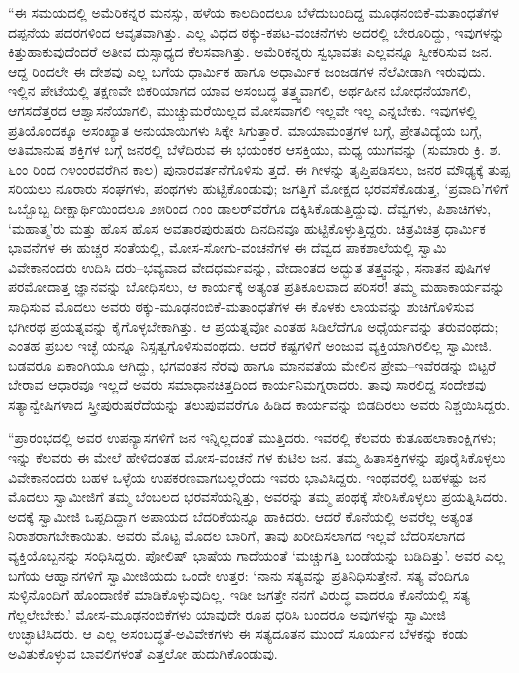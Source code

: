 “ಈ ಸಮಯದಲ್ಲಿ ಅಮೆರಿಕನ್ನರ ಮನಸ್ಸು, ಹಳೆಯ ಕಾಲದಿಂದಲೂ ಬೆಳೆದುಬಂದಿದ್ದ ಮೂಢನಂಬಿಕೆ-ಮತಾಂಧತೆಗಳ ದಪ್ಪನೆಯ ಪದರಗಳಿಂದ ಆವೃತವಾಗಿತ್ತು. ಎಲ್ಲ ವಿಧದ ಠಕ್ಕು-ಕಪಟ-ವಂಚನೆಗಳು ಅದರಲ್ಲಿ ಬೇರೂರಿದ್ದು, ಇವುಗಳನ್ನು ಕಿತ್ತುಹಾಕುವುದೆಂದರೆ ಅತೀವ ದುಸ್ಸಾಧ್ಯದ ಕೆಲಸವಾಗಿತ್ತು. ಅಮೆರಿಕನ್ನರು ಸ್ವಭಾವತಃ ಎಲ್ಲವನ್ನೂ ಸ್ವೀಕರಿಸುವ ಜನ. ಆದ್ದ ರಿಂದಲೇ ಈ ದೇಶವು ಎಲ್ಲ ಬಗೆಯ ಧಾರ್ಮಿಕ ಹಾಗೂ ಅಧಾರ್ಮಿಕ ಜಂಜಡಗಳ ನೆಲೆವೀಡಾಗಿ ಇರುವುದು. ಇಲ್ಲಿನ ಪೇಟೆಯಲ್ಲಿ ತಕ್ಷಣವೇ ಬಿಕರಿಯಾಗದ ಯಾವ ಅಸಂಬದ್ಧ ತತ್ತ್ವವಾಗಲಿ, ಅರ್ಥಹೀನ ಬೋಧನೆಯಾಗಲಿ, ಆಗಸದೆತ್ತರದ ಆಶ್ವಾಸನೆಯಾಗಲಿ, ಮುಚ್ಚುಮರೆಯಿಲ್ಲದ ಮೋಸವಾಗಲಿ ಇಲ್ಲವೇ ಇಲ್ಲ ಎನ್ನಬೇಕು. ಇವುಗಳಲ್ಲಿ ಪ್ರತಿಯೊಂದಕ್ಕೂ ಅಸಂಖ್ಯಾತ ಅನುಯಾಯಿಗಳು ಸಿಕ್ಕೇ ಸಿಗುತ್ತಾರೆ. ಮಾಯಾಮಂತ್ರಗಳ ಬಗ್ಗೆ, ಪ್ರೇತವಿದ್ಯೆಯ ಬಗ್ಗೆ, ಅತಿಮಾನುಷ ಶಕ್ತಿಗಳ ಬಗ್ಗೆ ಜನರಲ್ಲಿ ಬೆಳೆದಿರುವ ಈ ಭಯಂಕರ ಆಸಕ್ತಿಯು, ಮಧ್ಯ ಯುಗವನ್ನು (ಸುಮಾರು ಕ್ರಿ. ಶ. ೬ಂಂ ರಿಂದ ೧೪ಂಂರವರೆಗಿನ ಕಾಲ) ಪುನಾರವರ್ತನೆಗೊಳಿಸು ತ್ತದೆ. ಈ ಗೀಳನ್ನು ತೃಪ್ತಿಪಡಿಸಲು, ಜನರ ಮೌಢ್ಯಕ್ಕೆ ತುಪ್ಪ ಸರಿಯಲು ನೂರಾರು ಸಂಘಗಳು, ಪಂಥಗಳು ಹುಟ್ಟಿಕೊಂಡುವು; ಜಗತ್ತಿಗೆ ಮೋಕ್ಷದ ಭರವಸೆಕೊಡುತ್ತ, ‘ಪ್ರವಾದಿ’ಗಳಿಗೆ ಒಬ್ಬೊಬ್ಬ ದೀಕ್ಷಾರ್ಥಿಯಿಂದಲೂ ೨೫ರಿಂದ ೧ಂಂ ಡಾಲರ್​ವರೆಗೂ ದಕ್ಕಿಸಿಕೊಡುತ್ತಿದ್ದುವು. ದೆವ್ವಗಳು, ಪಿಶಾಚಿಗಳು, ‘ಮಹಾತ್ಮ’ರು ಮತ್ತು ಹೊಸ ಹೊಸ ಅವತಾರಪುರುಷರು ದಿನದಿನವೂ ಹುಟ್ಟಿಕೊಳ್ಳುತ್ತಿದ್ದರು. ಚಿತ್ರವಿಚಿತ್ರ ಧಾರ್ಮಿಕ ಭಾವನೆಗಳ ಈ ಹುಚ್ಚರ ಸಂತೆಯಲ್ಲಿ, ಮೋಸ-ಸೋಗು-ವಂಚನೆಗಳ ಈ ದೆವ್ವದ ಪಾಕಶಾಲೆಯಲ್ಲಿ ಸ್ವಾಮಿ ವಿವೇಕಾನಂದರು ಉದಿಸಿ ದರು–ಭವ್ಯವಾದ ವೇದಧರ್ಮವನ್ನು, ವೇದಾಂತದ ಅದ್ಭುತ ತತ್ತ್ವವನ್ನು, ಸನಾತನ ಪುಷಿಗಳ ಪರಮೋದಾತ್ತ ಜ್ಞಾನವನ್ನು ಬೋಧಿಸಲು, ಆ ಕಾರ್ಯಕ್ಕೆ ಅತ್ಯಂತ ಪ್ರತಿಕೂಲವಾದ ಪರಿಸರ! ತಮ್ಮ ಮಹಾಕಾರ್ಯವನ್ನು ಸಾಧಿಸುವ ಮೊದಲು ಅವರು ಠಕ್ಕು-ಮೂಢನಂಬಿಕೆ-ಮತಾಂಧತೆಗಳ ಈ ಕೊಳಕು ಲಾಯವನ್ನು ಶುಚಿಗೊಳಿಸುವ ಭಗೀರಥ ಪ್ರಯತ್ನವನ್ನು ಕೈಗೊಳ್ಳಬೇಕಾಗಿತ್ತು. ಆ ಪ್ರಯತ್ನವೋ ಎಂತಹ ಸಿಡಿಲೆದೆಗೂ ಅಧೈರ್ಯವನ್ನು ತರುವಂಥದು; ಎಂತಹ ಪ್ರಬಲ ಇಚ್ಛೆ ಯನ್ನೂ ನಿಸ್ಸತ್ವಗೊಳಿಸುವಂಥದು. ಆದರೆ ಕಷ್ಟಗಳಿಗೆ ಅಂಜುವ ವ್ಯಕ್ತಿಯಾಗಿರಲಿಲ್ಲ ಸ್ವಾಮೀಜಿ. ಬಡವರೂ ಏಕಾಂಗಿಯೂ ಆಗಿದ್ದು, ಭಗವಂತನ ನೆರವು ಹಾಗೂ ಮಾನವತೆಯ ಮೇಲಿನ ಪ್ರೇಮ–ಇವೆರಡನ್ನು ಬಿಟ್ಟರೆ ಬೇರಾವ ಆಧಾರವೂ ಇಲ್ಲದೆ ಅವರು ಸಮಾಧಾನಚಿತ್ತದಿಂದ ಕಾರ್ಯನಿಮಗ್ನರಾದರು. ತಾವು ಸಾರಲಿದ್ದ ಸಂದೇಶವು ಸತ್ಯಾನ್ವೇಷಿಗಳಾದ ಸ್ತ್ರೀಪುರುಷರೆದೆಯನ್ನು ತಲುಪುವವರೆಗೂ ಹಿಡಿದ ಕಾರ್ಯವನ್ನು ಬಿಡದಿರಲು ಅವರು ನಿಶ್ಚಯಿಸಿದ್ದರು.

“ಪ್ರಾರಂಭದಲ್ಲಿ ಅವರ ಉಪನ್ಯಾಸಗಳಿಗೆ ಜನ ಇನ್ನಿಲ್ಲದಂತೆ ಮುತ್ತಿದರು. ಇವರಲ್ಲಿ ಕೆಲವರು ಕುತೂಹಲಾಕಾಂಕ್ಷಿಗಳು; ಇನ್ನು ಕೆಲವರು ಈ ಮೇಲೆ ಹೇಳಿದಂತಹ ಮೋಸ-ವಂಚನೆ ಗಳ ಕುಟಿಲ ಜನ. ತಮ್ಮ ಹಿತಾಸಕ್ತಿಗಳನ್ನು ಪೂರೈಸಿಕೊಳ್ಳಲು ವಿವೇಕಾನಂದರು ಬಹಳ ಒಳ್ಳೆಯ ಉಪಕರಣವಾಗಬಲ್ಲರೆಂದು ಇವರು ಭಾವಿಸಿದ್ದರು. ಇಂಥವರಲ್ಲಿ ಬಹಳಷ್ಟು ಜನ ಮೊದಲು ಸ್ವಾಮೀಜಿಗೆ ತಮ್ಮ ಬೆಂಬಲದ ಭರವಸೆಯನ್ನಿತ್ತು, ಅವರನ್ನು ತಮ್ಮ ಪಂಥಕ್ಕೆ ಸೇರಿಸಿಕೊಳ್ಳಲು ಪ್ರಯತ್ನಿಸಿದರು. ಅದಕ್ಕೆ ಸ್ವಾಮೀಜಿ ಒಪ್ಪದಿದ್ದಾಗ ಅಪಾಯದ ಬೆದರಿಕೆಯನ್ನೂ ಹಾಕಿದರು. ಆದರೆ ಕೊನೆಯಲ್ಲಿ ಅವರೆಲ್ಲ ಅತ್ಯಂತ ನಿರಾಶರಾಗಬೇಕಾಯಿತು. ಅವರು ಮೊಟ್ಟ ಮೊದಲ ಬಾರಿಗೆ, ತಾವು ಖರೀದಿಸಲಾಗದ ಇಲ್ಲವೆ ಬೆದರಿಸಲಾಗದ ವ್ಯಕ್ತಿಯೊಬ್ಬನನ್ನು ಸಂಧಿಸಿದ್ದರು. ಪೋಲಿಷ್ ಭಾಷೆಯ ಗಾದೆಯಂತೆ ‘ಮಚ್ಚುಗತ್ತಿ ಬಂಡೆಯನ್ನು ಬಡಿದಿತ್ತು’. ಅವರ ಎಲ್ಲ ಬಗೆಯ ಆಹ್ವಾನಗಳಿಗೆ ಸ್ವಾಮೀಜಿಯದು ಒಂದೇ ಉತ್ತರ: ‘ನಾನು ಸತ್ಯವನ್ನು ಪ್ರತಿನಿಧಿಸುತ್ತೇನೆ. ಸತ್ಯ ವೆಂದಿಗೂ ಸುಳ್ಳಿನೊಂದಿಗೆ ಹೊಂದಾಣಿಕೆ ಮಾಡಿಕೊಳ್ಳುವುದಿಲ್ಲ. ಇಡೀ ಜಗತ್ತೇ ನನಗೆ ವಿರುದ್ಧ ವಾದರೂ ಕೊನೆಯಲ್ಲಿ ಸತ್ಯ ಗೆಲ್ಲಲೇಬೇಕು.’ ಮೋಸ-ಮೂಢನಂಬಿಕೆಗಳು ಯಾವುದೇ ರೂಪ ಧರಿಸಿ ಬಂದರೂ ಅವುಗಳನ್ನು ಸ್ವಾಮೀಜಿ ಉಚ್ಛಾಟಿಸಿದರು. ಆ ಎಲ್ಲ ಅಸಂಬದ್ಧತೆ-ಅವಿವೇಕಗಳು ಈ ಸತ್ಯದೂತನ ಮುಂದೆ ಸೂರ್ಯನ ಬೆಳಕನ್ನು ಕಂಡು ಅವಿತುಕೊಳ್ಳುವ ಬಾವಲಿಗಳಂತೆ ಎತ್ತಲೋ ಹುದುಗಿಕೊಂಡುವು.

